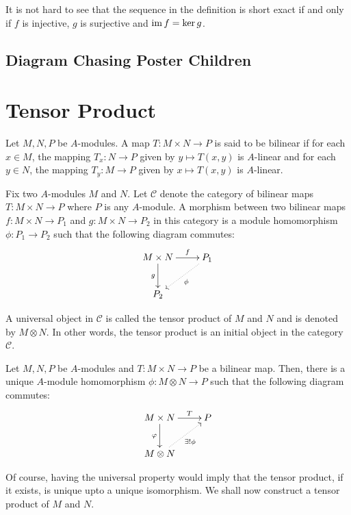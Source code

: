 It is not hard to see that the sequence in the definition is short exact if and only if $f$ is injective, $g$ is surjective and $\operatorname{im} f = \ker g$.

\subsection{Diagram Chasing Poster Children}


\section{Tensor Product}

\begin{definition}
    Let $M, N, P$ be $A$-modules. A map $T: M\times N\to P$ is said to be bilinear if for each $x\in M$, the mapping $T_x: N\to P$ given by $y\mapsto T(x,y)$ is $A$-linear and for each $y\in N$, the mapping $T_y: M\to P$ given by $x\mapsto T(x,y)$ is $A$-linear.
\end{definition}

Fix two $A$-modules $M$ and $N$. Let $\mathscr C$ denote the category of bilinear maps $T: M\times N\to P$ where $P$ is any $A$-module. A morphism between two bilinear maps $f: M\times N\to P_1$ and $g: M\times N\to P_2$ in this category is a module homomorphism $\phi: P_1\to P_2$ such that the following diagram commutes: 
\begin{equation*}
\xymatrix {
    M\times N\ar[r]^-f\ar[d]_g & P_1\ar@{.>}[ld]^\phi\\
    P_2
}
\end{equation*}

A universal object in $\mathscr C$ is called the tensor product of $M$ and $N$ and is denoted by $M\otimes N$. In other words, the tensor product is an initial object in the category $\mathscr C$.

\begin{definition}
    Let $M,N,P$ be $A$-modules and $T: M\times N\to P$ be a bilinear map. Then, there is a unique $A$-module homomorphism $\phi: M\otimes N\to P$ such that the following diagram commutes: 
    \begin{equation*}
    \xymatrix {
        M\times N\ar[r]^-T\ar[d]_\varphi & P\\
        M\otimes N\ar@{.>}[ru]_{\exists!\phi}
    }
    \end{equation*}
\end{definition}

Of course, having the universal property would imply that the tensor product, if it exists, is unique upto a unique isomorphism. We shall now construct a tensor product of $M$ and $N$.


